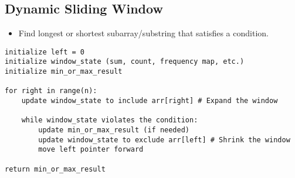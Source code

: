 \subsection{Dynamic Sliding Window}
\begin{summary}
    \begin{itemize}
        \item Find longest or shortest subarray/substring that satisfies a condition.
    \end{itemize}
\end{summary}

\begin{algo}
\begin{lstlisting}
initialize left = 0
initialize window_state (sum, count, frequency map, etc.)
initialize min_or_max_result

for right in range(n):
    update window_state to include arr[right] # Expand the window

    while window_state violates the condition:
        update min_or_max_result (if needed)
        update window_state to exclude arr[left] # Shrink the window
        move left pointer forward

return min_or_max_result
\end{lstlisting}
\end{algo}

